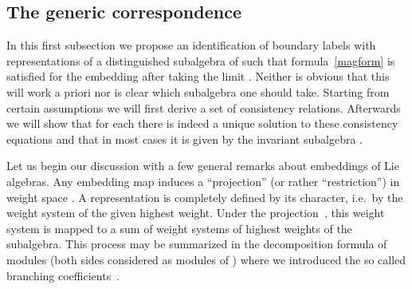 \documentclass[12pt,a4paper]{article}
\providecommand{\embin}{{\hookrightarrow}}
\providecommand{\Natural}{\mathbb{N}}
\providecommand{\mf}{\mathfrak} %
\providecommand{\mc}{\mathcal} %
\def\sg{\mf{h}^\omega} %
\def\ig{\mf{g}^\omega} %
\begin{document}
\begin{appendix}
\subsection{The generic correspondence}

In this first subsection we propose an identification of boundary labels
with representations of a distinguished subalgebra \myHighlight{$\sg$}\coordHE{} of \myHighlight{$\mf{g}$}\coordHE{} such
that formula~\eqref{magform} is satisfied for the embedding \myHighlight{$\sg\embin\mf{g}$}\coordHE{}
after taking the limit \coordHE{}.
Neither is obvious that this will work a priori
nor is clear which subalgebra one should take. Starting from certain
assumptions we will first derive a set of consistency relations.
Afterwards we will show that for each \myHighlight{$\mf{g}$}\coordHE{} there is indeed a unique solution
\myHighlight{$\sg$}\coordHE{} to these consistency equations and that in most cases it is given by the
invariant subalgebra \myHighlight{$\ig$}\coordHE{}.

Let us begin our discussion with a few general remarks about embeddings
of Lie algebras.  
Any embedding map \myHighlight{$\iota:\sg\hookrightarrow\mf{g}$}\coordHE{} 
induces a ``projection'' (or rather ``restriction'') in weight space 
\myHighlight{$\mc{P}:L_w^{(\mf{g})}\rightarrow L_w^{(\sg)}$}\coordHE{}. A representation 
is completely defined by its character, i.e.\ by the weight system 
of the given highest weight. Under the projection~\myHighlight{$\mc{P}$}\coordHE{}, this 
weight system is mapped to a sum of weight systems of highest 
weights of the subalgebra. This process may be summarized in the 
decomposition formula \coordHE{} of modules (both
sides considered as modules of \myHighlight{$\sg$}\coordHE{}) where
we introduced the so called branching 
coefficients~\myHighlight{${b_A}^c\in\Natural_0$}\coordHE{}.
\smallskip


\end{appendix}
\end{document}
